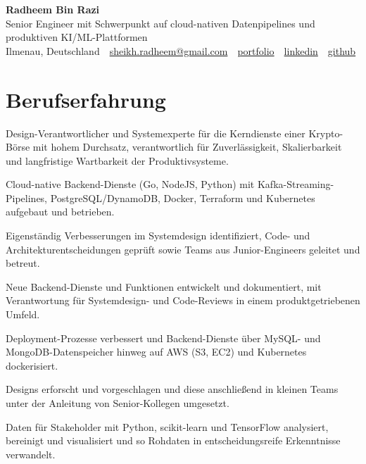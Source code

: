 \documentclass[11pt,a4paper]{resume}
\makeatletter
\newcommand{\Portfolio}{https://radheem.github.io/my-cv}
\newcommand{\PortfolioText}{portfolio}
\newcommand{\GitHub}{https://github.com/radheem}
\newcommand{\LinkedIn}{https://www.linkedin.com/in/radheem-razi}
\newcommand{\Email}{sheikh.radheem@gmail.com}
\makeatother
\begin{document}
\clearpage
{}

\begin{center}
  {\huge\bfseries Radheem Bin Razi}\\[3pt]
  {\large Senior Engineer mit Schwerpunkt auf cloud-nativen Datenpipelines und produktiven KI/ML-Plattformen}\\[6pt]
  \small
  Ilmenau, Deutschland \,\textbar\,
  \href{mailto:\Email}{\Email} \,\textbar\,
  \href{\Portfolio}{\PortfolioText} \,\textbar\,
  \href{\LinkedIn}{linkedin} \,\textbar\,
  \href{\GitHub}{github}
\end{center}
\vspace{2pt}

\section{Berufserfahrung}

\bullets
  \item Design-Verantwortlicher und Systemexperte für die Kerndienste einer Krypto-Börse mit hohem Durchsatz, verantwortlich für Zuverlässigkeit, Skalierbarkeit und langfristige Wartbarkeit der Produktivsysteme.
  \item Cloud-native Backend-Dienste (Go, NodeJS, Python) mit Kafka-Streaming-Pipelines, PostgreSQL/DynamoDB, Docker, Terraform und Kubernetes aufgebaut und betrieben.
  \item Eigenständig Verbesserungen im Systemdesign identifiziert, Code- und Architekturentscheidungen geprüft sowie Teams aus Junior-Engineers geleitet und betreut.
\bulletsend
\vspace{3pt}
\bullets
  \item Neue Backend-Dienste und Funktionen entwickelt und dokumentiert, mit Verantwortung für Systemdesign- und Code-Reviews in einem produktgetriebenen Umfeld.
  \item Deployment-Prozesse verbessert und Backend-Dienste über MySQL- und MongoDB-Datenspeicher hinweg auf AWS (S3, EC2) und Kubernetes dockerisiert.
\bulletsend
\vspace{3pt}
\bullets
  \item Designs erforscht und vorgeschlagen und diese anschließend in kleinen Teams unter der Anleitung von Senior-Kollegen umgesetzt.
  \item Daten für Stakeholder mit Python, scikit-learn und TensorFlow analysiert, bereinigt und visualisiert und so Rohdaten in entscheidungsreife Erkenntnisse verwandelt.
\bulletsend
\vspace{3pt}
\end{document}
